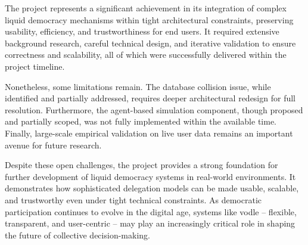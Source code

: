 The project represents a significant achievement in its integration of complex liquid democracy mechanisms within tight architectural constraints, preserving usability, efficiency, and trustworthiness for end users. It required extensive background research, careful technical design, and iterative validation to ensure correctness and scalability, all of which were successfully delivered within the project timeline.

Nonetheless, some limitations remain. The database collision issue, while identified and partially addressed, requires deeper architectural redesign for full resolution. Furthermore, the agent-based simulation component, though proposed and partially scoped, was not fully implemented within the available time. Finally, large-scale empirical validation on live user data remains an important avenue for future research.

Despite these open challenges, the project provides a strong foundation for further development of liquid democracy systems in real-world environments. It demonstrates how sophisticated delegation models can be made usable, scalable, and trustworthy even under tight technical constraints. As democratic participation continues to evolve in the digital age, systems like vodle -- flexible, transparent, and user-centric -- may play an increasingly critical role in shaping the future of collective decision-making.